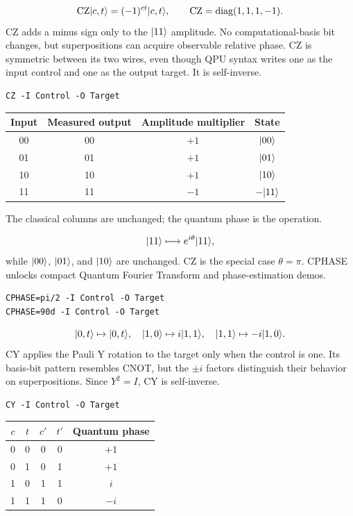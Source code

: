 \[
\mathrm{CZ}\lvert c,t\rangle=(-1)^{ct}\lvert c,t\rangle,\qquad
\mathrm{CZ}=\operatorname{diag}(1,1,1,-1).
\]
CZ adds a minus sign only to the $\lvert 11\rangle$ amplitude. No computational-basis
bit changes, but superpositions can acquire observable relative phase. CZ is
symmetric between its two wires, even though QPU syntax writes one as the
input control and one as the output target. It is self-inverse.
\begin{lstlisting}
CZ -I Control -O Target
\end{lstlisting}
\begin{center}
\begin{tabular}{cc|cc}\toprule Input & Measured output & Amplitude multiplier & State\\\midrule
00&00&$+1$&$\lvert 00\rangle$\\01&01&$+1$&$\lvert 01\rangle$\\
10&10&$+1$&$\lvert 10\rangle$\\11&11&$-1$&$-\lvert 11\rangle$\\\bottomrule
\end{tabular}
\end{center}
The classical columns are unchanged; the quantum phase is the operation.


\[
\lvert 11\rangle\longmapsto e^{i\theta}\lvert 11\rangle,
\]
while $\lvert 00\rangle$, $\lvert 01\rangle$, and $\lvert 10\rangle$ are unchanged. CZ is the special
case $\theta=\pi$. CPHASE unlocks compact Quantum Fourier Transform and
phase-estimation demos.
\begin{lstlisting}
CPHASE=pi/2 -I Control -O Target
CPHASE=90d -I Control -O Target
\end{lstlisting}


\[
\lvert 0,t\rangle\mapsto\lvert 0,t\rangle,\quad
\lvert 1,0\rangle\mapsto i\lvert 1,1\rangle,\quad
\lvert 1,1\rangle\mapsto-i\lvert 1,0\rangle.
\]
CY applies the Pauli Y rotation to the target only when the control is one. Its
basis-bit pattern resembles CNOT, but the $\pm i$ factors distinguish their
behavior on superpositions. Since $Y^2=I$, CY is self-inverse.
\begin{lstlisting}
CY -I Control -O Target
\end{lstlisting}
\begin{center}
\begin{tabular}{cc|cc|c}\toprule $c$&$t$&$c'$&$t'$&Quantum phase\\\midrule
0&0&0&0&$+1$\\0&1&0&1&$+1$\\
1&0&1&1&$i$\\1&1&1&0&$-i$\\\bottomrule
\end{tabular}
\end{center}

